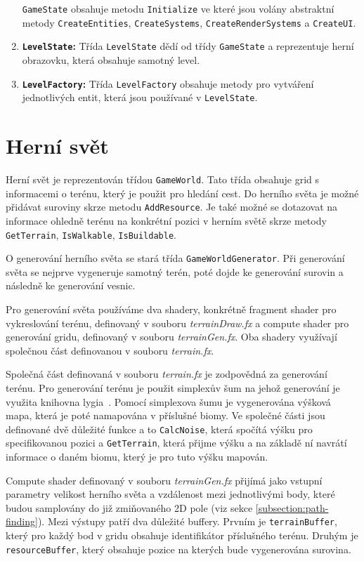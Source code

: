 \begin{enumerate}
    \verb|GameState| obsahuje metodu \verb|Initialize| ve které jsou volány abstraktní metody \verb|CreateEntities|, \verb|CreateSystems|, \verb|CreateRenderSystems| a \verb|CreateUI|.

    \item \textbf{\texttt{LevelState}:} Třída \verb|LevelState| dědí od třídy \verb|GameState| a reprezentuje herní obrazovku, která obsahuje samotný level.

    \item \textbf{\texttt{LevelFactory}:} Třída \verb|LevelFactory| obsahuje metody pro vytváření jednotlivých entit, která jsou používané v \verb|LevelState|.
\end{enumerate}

\section{Herní svět}
Herní svět je reprezentován třídou \verb|GameWorld|. Tato třída obsahuje grid s informacemi o terénu, který je použit pro hledání cest. Do herního světa je možné přidávat suroviny skrze metodu \verb|AddResource|. Je také možné se dotazovat na informace ohledně terénu na konkrétní pozici v herním světě skrze metody \verb|GetTerrain|, \verb|IsWalkable|, \verb|IsBuildable|.

O generování herního světa se stará třída \verb|GameWorldGenerator|. Při generování světa se nejprve vygeneruje samotný terén, poté dojde ke generování surovin a následně ke generování vesnic.

Pro generování světa používáme dva shadery, konkrétně fragment shader pro vykreslování terénu, definovaný v souboru \textit{terrainDraw.fx} a compute shader pro generování gridu, definovaný v souboru \textit{terrainGen.fx}. Oba shadery využívají společnou část definovanou v souboru \textit{terrain.fx}.

Společná část definovaná v souboru \textit{terrain.fx} je zodpovědná za generování terénu. Pro generování terénu je použit simplexův šum na jehož generování je využita knihovna lygia~\cite{lygia}. Pomocí simplexova šumu je vygenerována výšková mapa, která je poté namapována v příslušné biomy. Ve společné části jsou definované dvě důležité funkce a to \verb|CalcNoise|, která spočítá výšku pro specifikovanou pozici a \verb|GetTerrain|, která přijme výšku a na základě ní navrátí informace o daném biomu, který je pro tuto výšku mapován.

Compute shader definovaný v souboru \textit{terrainGen.fx} přijímá jako vstupní parametry velikost herního světa a vzdálenost mezi jednotlivými body, které budou samplovány do již zmiňovaného 2D pole (viz sekce \ref{subsection:path-finding}). Mezi výstupy patří dva důležité buffery. Prvním je \verb|terrainBuffer|, který pro každý bod v gridu obsahuje identifikátor příslušného terénu. Druhým je \verb|resourceBuffer|, který obsahuje pozice na kterých bude vygenerována surovina.


